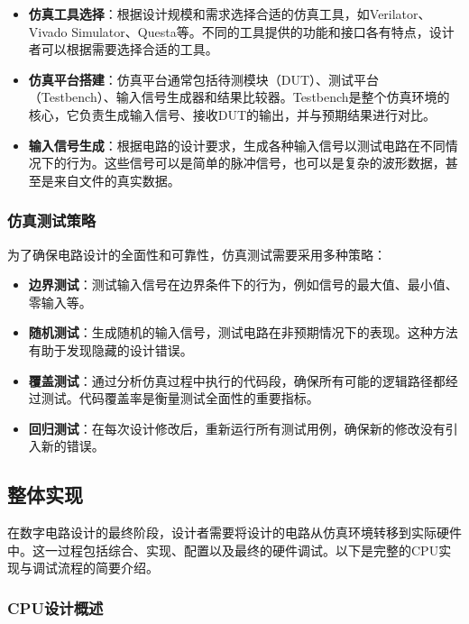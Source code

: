 \begin{itemize}
\tightlist
\item
  \textbf{仿真工具选择}：根据设计规模和需求选择合适的仿真工具，如Verilator、Vivado Simulator、Questa等。不同的工具提供的功能和接口各有特点，设计者可以根据需要选择合适的工具。
\item
  \textbf{仿真平台搭建}：仿真平台通常包括待测模块（DUT）、测试平台（Testbench）、输入信号生成器和结果比较器。Testbench是整个仿真环境的核心，它负责生成输入信号、接收DUT的输出，并与预期结果进行对比。
\item
  \textbf{输入信号生成}：根据电路的设计要求，生成各种输入信号以测试电路在不同情况下的行为。这些信号可以是简单的脉冲信号，也可以是复杂的波形数据，甚至是来自文件的真实数据。
\end{itemize}

\subsubsection{仿真测试策略}\label{sec:03-digital-logic-026}

为了确保电路设计的全面性和可靠性，仿真测试需要采用多种策略：

\begin{itemize}
\tightlist
\item
  \textbf{边界测试}：测试输入信号在边界条件下的行为，例如信号的最大值、最小值、零输入等。
\item
  \textbf{随机测试}：生成随机的输入信号，测试电路在非预期情况下的表现。这种方法有助于发现隐藏的设计错误。
\item
  \textbf{覆盖测试}：通过分析仿真过程中执行的代码段，确保所有可能的逻辑路径都经过测试。代码覆盖率是衡量测试全面性的重要指标。
\item
  \textbf{回归测试}：在每次设计修改后，重新运行所有测试用例，确保新的修改没有引入新的错误。
\end{itemize}

\subsection{整体实现}\label{sec:03-digital-logic-027}

在数字电路设计的最终阶段，设计者需要将设计的电路从仿真环境转移到实际硬件中。这一过程包括综合、实现、配置以及最终的硬件调试。以下是完整的CPU实现与调试流程的简要介绍。

\subsubsection{CPU设计概述}\label{sec:03-digital-logic-028}


